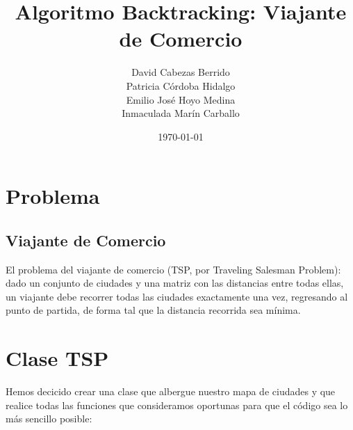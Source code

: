 \documentclass[a4]{article}
\author{David Cabezas Berrido \\ Patricia Córdoba Hidalgo \\ Emilio José Hoyo Medina \\ Inmaculada Marín Carballo}
\date{\vspace{-5mm} \today}
\title{\huge Algoritmo Backtracking: Viajante de Comercio \HRule\vspace{-4mm} }
\begin{document}
\maketitle
\vspace{20mm}
\tableofcontents
\newpage

\section{Problema}
\subsection{Viajante de Comercio}
El problema del viajante de comercio (TSP, por Traveling Salesman Problem): dado un conjunto de ciudades y una matriz con las distancias entre todas ellas, un viajante debe recorrer todas las ciudades exactamente una vez, regresando al punto de partida, de forma tal que la distancia recorrida sea mínima.


\section{Clase TSP}
Hemos decicido crear una clase que albergue nuestro mapa de ciudades y que realice todas las funciones que consideramos oportunas para que el código sea lo más sencillo posible:
\end{document}
